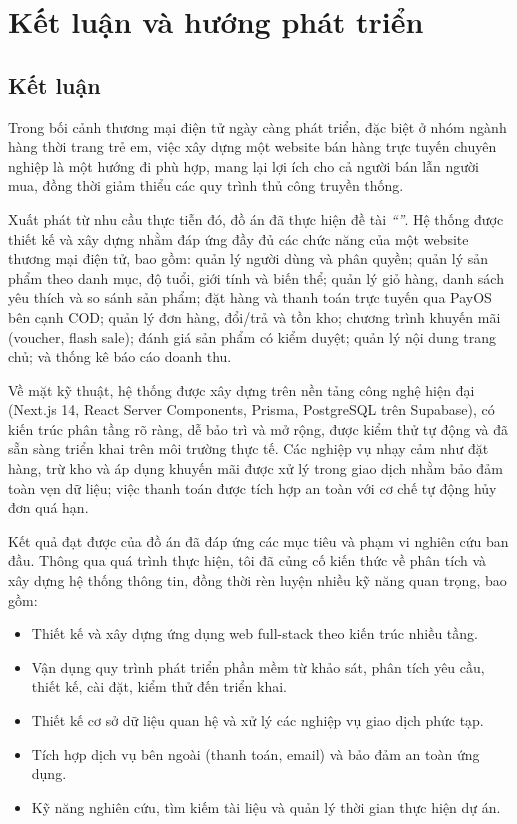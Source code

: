 \chapter{Kết luận và hướng phát triển}
\label{ch:conclusion}

\section{Kết luận}

Trong bối cảnh thương mại điện tử ngày càng phát triển, đặc biệt ở nhóm ngành hàng thời trang
trẻ em, việc xây dựng một website bán hàng trực tuyến chuyên nghiệp là một hướng đi phù hợp,
mang lại lợi ích cho cả người bán lẫn người mua, đồng thời giảm thiểu các quy trình thủ công
truyền thống.

Xuất phát từ nhu cầu thực tiễn đó, đồ án đã thực hiện đề tài \textit{``\thesisTitle''}. Hệ thống được
thiết kế và xây dựng nhằm đáp ứng đầy đủ các chức năng của một website thương mại điện tử, bao
gồm: quản lý người dùng và phân quyền; quản lý sản phẩm theo danh mục, độ tuổi, giới tính và
biến thể; quản lý giỏ hàng, danh sách yêu thích và so sánh sản phẩm; đặt hàng và thanh toán trực
tuyến qua PayOS bên cạnh COD; quản lý đơn hàng, đổi/trả và tồn kho; chương trình khuyến mãi
(voucher, flash sale); đánh giá sản phẩm có kiểm duyệt; quản lý nội dung trang chủ; và thống kê
báo cáo doanh thu.

Về mặt kỹ thuật, hệ thống được xây dựng trên nền tảng công nghệ hiện đại (Next.js 14, React
Server Components, Prisma, PostgreSQL trên Supabase), có kiến trúc phân tầng rõ ràng, dễ bảo
trì và mở rộng, được kiểm thử tự động và đã sẵn sàng triển khai trên môi trường thực tế. Các
nghiệp vụ nhạy cảm như đặt hàng, trừ kho và áp dụng khuyến mãi được xử lý trong giao dịch nhằm
bảo đảm toàn vẹn dữ liệu; việc thanh toán được tích hợp an toàn với cơ chế tự động hủy đơn quá
hạn.

Kết quả đạt được của đồ án đã đáp ứng các mục tiêu và phạm vi nghiên cứu ban đầu. Thông qua
quá trình thực hiện, tôi đã củng cố kiến thức về phân tích và xây dựng hệ thống thông tin, đồng thời
rèn luyện nhiều kỹ năng quan trọng, bao gồm:

\begin{itemize}
  \item Thiết kế và xây dựng ứng dụng web full-stack theo kiến trúc nhiều tầng.
  \item Vận dụng quy trình phát triển phần mềm từ khảo sát, phân tích yêu cầu, thiết kế, cài đặt,
  kiểm thử đến triển khai.
  \item Thiết kế cơ sở dữ liệu quan hệ và xử lý các nghiệp vụ giao dịch phức tạp.
  \item Tích hợp dịch vụ bên ngoài (thanh toán, email) và bảo đảm an toàn ứng dụng.
  \item Kỹ năng nghiên cứu, tìm kiếm tài liệu và quản lý thời gian thực hiện dự án.
\end{itemize}

